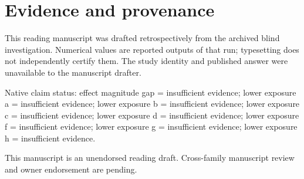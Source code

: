 \documentclass[10pt,a4paper]{article}
\begin{document}
\section*{Evidence and provenance}
This reading manuscript was drafted retrospectively from the archived blind investigation. Numerical values are reported outputs of that run; typesetting does not independently certify them. The study identity and published answer were unavailable to the manuscript drafter.
\par
Native claim status: effect magnitude gap = insufficient evidence; lower exposure a = insufficient evidence; lower exposure b = insufficient evidence; lower exposure c = insufficient evidence; lower exposure d = insufficient evidence; lower exposure f = insufficient evidence; lower exposure g = insufficient evidence; lower exposure h = insufficient evidence.
\par
This manuscript is an unendorsed reading draft. Cross-family manuscript review and owner endorsement are pending.
\par
\end{document}
